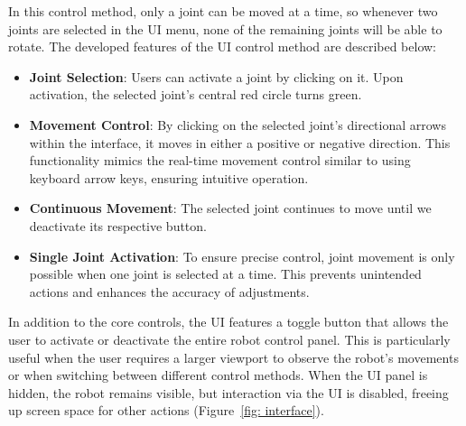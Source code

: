 
    In this control method, only a joint can be moved at a time, so whenever two joints are selected in the \ac{UI} menu, none of the remaining joints will be able to rotate.
    The developed features of the \ac{UI} control method are described below:
    \begin{itemize}
        \item \textbf{Joint Selection}: Users can activate a joint by clicking on it. Upon activation, the selected joint's central red circle turns green.
        \item \textbf{Movement Control}: By clicking on the selected joint's directional arrows within the interface, it moves in either a 
        positive or negative direction. This functionality mimics the real-time movement control similar to using keyboard arrow keys, ensuring 
        intuitive operation.
        \item \textbf{Continuous Movement}: The selected joint continues to move until we deactivate its respective button.
        \item \textbf{Single Joint Activation}: To ensure precise control, joint movement is only possible when one joint is selected at a time. 
        This prevents unintended actions and enhances the accuracy of adjustments.
    \end{itemize}
    
   

    In addition to the core controls, the \ac{UI} features a toggle button that allows the user to activate or deactivate the entire robot control panel. This is particularly useful when the user requires a larger viewport to observe the robot's movements or when switching between different control methods. When the \ac{UI} panel is hidden, the robot remains visible, but interaction via the \ac{UI} is disabled, freeing up screen space for other actions (Figure~\ref{fig: interface}). 

